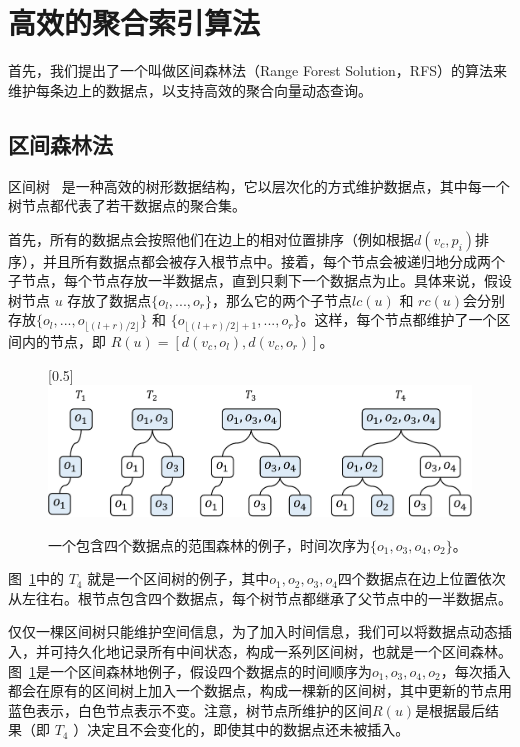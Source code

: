 \section{高效的聚合索引算法}
\label{sec5:solution}

首先，我们提出了一个叫做区间森林法（Range Forest Solution，RFS）的算法来维护每条边上的数据点，以支持高效的聚合向量动态查询。

\subsection{区间森林法}
\label{subsec:RFS}

	区间树~\cite{de2000computational} 是一种高效的树形数据结构，它以层次化的方式维护数据点，其中每一个树节点都代表了若干数据点的聚合集。

	首先，所有的数据点会按照他们在边上的相对位置排序（例如根据$d(v_c, p_i)$排序），并且所有数据点都会被存入根节点中。接着，每个节点会被递归地分成两个子节点，每个节点存放一半数据点，直到只剩下一个数据点为止。具体来说，假设树节点 $u$ 存放了数据点$\{o_l,...,o_r\}$，那么它的两个子节点$lc(u)$ 和 $rc(u)$会分别存放$\{o_l,...,o_{\lfloor (l + r) / 2 \rfloor}\}$ 和 $\{o_{\lfloor (l + r) / 2 \rfloor + 1},...,o_r\}$。这样，每个节点都维护了一个区间内的节点，即 $R(u) = [d(v_c, o_l), d(v_c, o_r)]$。
	
	\begin{figure}[h!]\centering
	\scalebox{0.5}[0.5]{\includegraphics{./figures/RFS_1.pdf}}
	\caption{一个包含四个数据点的范围森林的例子，时间次序为$\{o_1, o_3, o_4, o_2\}$。}
	\label{fig:RFS1}
	\end{figure}
		

	图~\ref{fig:RFS1}中的 $T_4$ 就是一个区间树的例子，其中$o_1, o_2, o_3, o_4$四个数据点在边上位置依次从左往右。根节点包含四个数据点，每个树节点都继承了父节点中的一半数据点。

	仅仅一棵区间树只能维护空间信息，为了加入时间信息，我们可以将数据点动态插入，并可持久化地记录所有中间状态，构成一系列区间树，也就是一个区间森林。图~\ref{fig:RFS1}是一个区间森林地例子，假设四个数据点的时间顺序为$o_1, o_3, o_4, o_2$，每次插入都会在原有的区间树上加入一个数据点，构成一棵新的区间树，其中更新的节点用蓝色表示，白色节点表示不变。注意，树节点所维护的区间$R(u)$是根据最后结果（即 $T_4$ ）决定且不会变化的，即使其中的数据点还未被插入。

